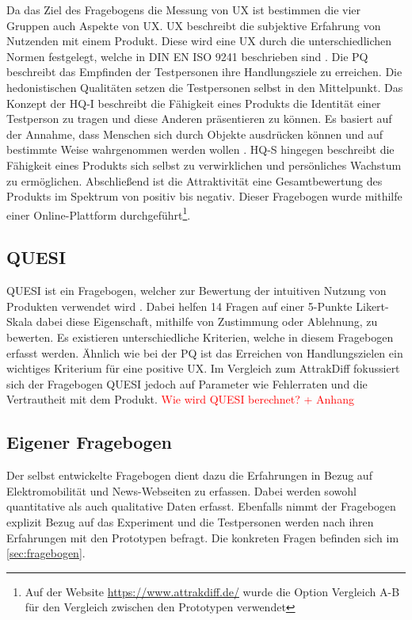 Da das Ziel des Fragebogens die Messung von \ac{UX} ist bestimmen die vier Gruppen auch Aspekte von \ac{UX}.
\ac{UX} beschreibt die subjektive Erfahrung von Nutzenden mit einem Produkt.
Diese wird eine \ac{UX} durch die unterschiedlichen Normen festgelegt, welche in DIN EN ISO 9241 beschrieben sind \cite{iso9241}.
Die \ac{PQ} beschreibt das Empfinden der Testpersonen ihre Handlungsziele zu erreichen.
Die hedonistischen Qualitäten setzen die Testpersonen selbst in den Mittelpunkt.
Das Konzept der \ac{HQ-I} beschreibt die Fähigkeit eines Produkts die Identität einer Testperson zu tragen und diese Anderen präsentieren zu können.
Es basiert auf der Annahme, dass Menschen sich durch Objekte ausdrücken können und auf bestimmte Weise wahrgenommen werden wollen \cite{prentice}.
\ac{HQ-S} hingegen beschreibt die Fähigkeit eines Produkts sich selbst zu verwirklichen und persönliches Wachstum zu ermöglichen.
Abschließend ist die Attraktivität eine Gesamtbewertung des Produkts im Spektrum von positiv bis negativ.
Dieser Fragebogen wurde mithilfe einer Online-Plattform durchgeführt\footnote{Auf der Website \url{https://www.attrakdiff.de/} wurde die Option \glqq Vergleich A-B\grqq{} für den Vergleich zwischen den Prototypen verwendet}.

\subsection{QUESI}
\ac{QUESI} ist ein Fragebogen, welcher zur Bewertung der intuitiven Nutzung von Produkten verwendet wird \cite{quesi-benchmarks, quesi-short}.
Dabei helfen 14 Fragen auf einer 5-Punkte Likert-Skala dabei diese Eigenschaft, mithilfe von Zustimmung oder Ablehnung, zu bewerten.
Es existieren unterschiedliche Kriterien, welche in diesem Fragebogen erfasst werden.
Ähnlich wie bei der \ac{PQ} ist das Erreichen von Handlungszielen ein wichtiges Kriterium für eine positive \ac{UX}.
Im Vergleich zum AttrakDiff fokussiert sich der Fragebogen \ac{QUESI} jedoch auf Parameter wie Fehlerraten und die Vertrautheit mit dem Produkt.
\textcolor{red}{Wie wird QUESI berechnet? + Anhang}

\subsection{Eigener Fragebogen}
Der selbst entwickelte Fragebogen dient dazu die Erfahrungen in Bezug auf Elektromobilität und News-Webseiten zu erfassen.
Dabei werden sowohl quantitative als auch qualitative Daten erfasst.
Ebenfalls nimmt der Fragebogen explizit Bezug auf das Experiment und die Testpersonen werden nach ihren Erfahrungen mit den Prototypen befragt.
Die konkreten Fragen befinden sich im \autoref{sec:fragebogen}.

